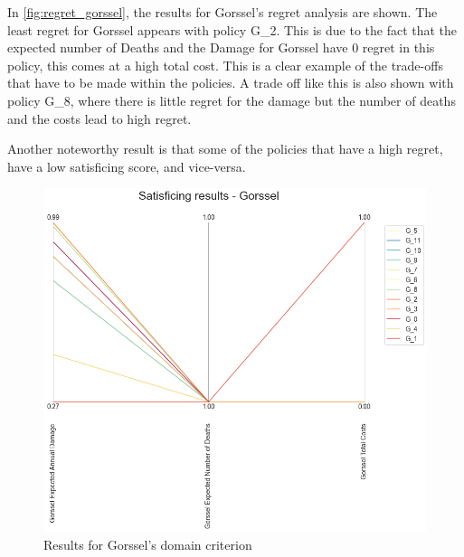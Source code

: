 \noindent In \autoref{fig:regret_gorssel}, the results for Gorssel's regret analysis are shown. The least regret for Gorssel appears with policy G\_2. This is due to the fact that the expected number of Deaths and the Damage for Gorssel have 0 regret in this policy, this comes at a high total cost. This is a clear example of the trade-offs that have to be made within the policies. A trade off like this is also shown with policy G\_8, where there is little regret for the damage but the number of deaths and the costs lead to high regret.

Another noteworthy result is that some of the policies that have a high regret, have a low satisficing score, and vice-versa.

\begin{figure}[H]
  \centering
  \begin{minipage}[b]{0.4\textwidth}
    \includegraphics[width=1.15\textwidth]{report/figures/results/domain_criterion_Gorssel.png}
    \caption{Results for Gorssel's domain criterion}
    \label{fig:domain_criterion_gorssel}
  \end{minipage}
  \hfill
  \begin{minipage}[b]{0.4\textwidth}

\end{minipage}
\end{figure}
